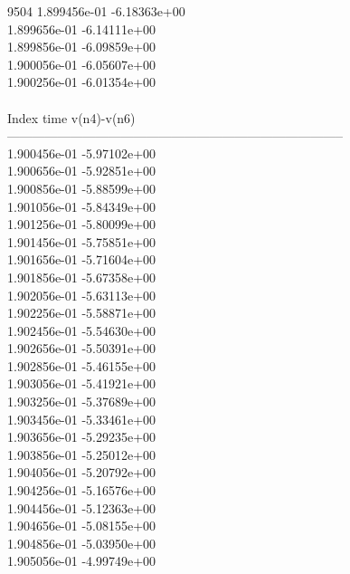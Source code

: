 9504	1.899456e-01	-6.18363e+00	\\ 	1.899656e-01	-6.14111e+00	\\ 	1.899856e-01	-6.09859e+00	\\ 	1.900056e-01	-6.05607e+00	\\ 	1.900256e-01	-6.01354e+00	\\ \hline
\\ \hline
Index   time            v(n4)-v(n6)     \\ \hline
--------------------------------------------------------------------------------\\ 	1.900456e-01	-5.97102e+00	\\ 	1.900656e-01	-5.92851e+00	\\ 	1.900856e-01	-5.88599e+00	\\ 	1.901056e-01	-5.84349e+00	\\ 	1.901256e-01	-5.80099e+00	\\ 	1.901456e-01	-5.75851e+00	\\ 	1.901656e-01	-5.71604e+00	\\ 	1.901856e-01	-5.67358e+00	\\ 	1.902056e-01	-5.63113e+00	\\ 	1.902256e-01	-5.58871e+00	\\ 	1.902456e-01	-5.54630e+00	\\ 	1.902656e-01	-5.50391e+00	\\ 	1.902856e-01	-5.46155e+00	\\ 	1.903056e-01	-5.41921e+00	\\ 	1.903256e-01	-5.37689e+00	\\ 	1.903456e-01	-5.33461e+00	\\ 	1.903656e-01	-5.29235e+00	\\ 	1.903856e-01	-5.25012e+00	\\ 	1.904056e-01	-5.20792e+00	\\ 	1.904256e-01	-5.16576e+00	\\ 	1.904456e-01	-5.12363e+00	\\ 	1.904656e-01	-5.08155e+00	\\ 	1.904856e-01	-5.03950e+00	\\ 	1.905056e-01	-4.99749e+00	\\ \hline
